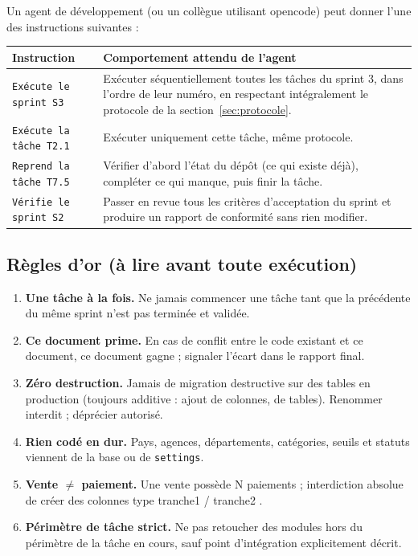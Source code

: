 \documentclass[11pt,a4paper]{article}
\begin{document}
Un agent de développement (ou un collègue utilisant opencode) peut donner l'une des instructions suivantes :

\begin{center}
\begin{tabularx}{\textwidth}{|l|Y|}
\hline
{}\textbf{Instruction} & \textbf{Comportement attendu de l'agent} \\ \hline
\verb|Exécute le sprint S3| & Exécuter séquentiellement toutes les tâches du sprint 3, dans l'ordre de leur numéro, en respectant intégralement le protocole de la section~\ref{sec:protocole}. \\ \hline
\verb|Exécute la tâche T2.1| & Exécuter uniquement cette tâche, même protocole. \\ \hline
\verb|Reprend la tâche T7.5| & Vérifier d'abord l'état du dépôt (ce qui existe déjà), compléter ce qui manque, puis finir la tâche. \\ \hline
\verb|Vérifie le sprint S2| & Passer en revue tous les critères d'acceptation du sprint et produire un rapport de conformité sans rien modifier. \\ \hline
\end{tabularx}
\end{center}

\subsection{Règles d'or (à lire avant toute exécution)}

\begin{enumerate}[nosep]
  \item \textbf{Une tâche à la fois.} Ne jamais commencer une tâche tant que la précédente du même sprint n'est pas terminée et validée.
  \item \textbf{Ce document prime.} En cas de conflit entre le code existant et ce document, ce document gagne ; signaler l'écart dans le rapport final.
  \item \textbf{Zéro destruction.} Jamais de migration destructive sur des tables en production (toujours additive : ajout de colonnes, de tables). Renommer interdit ; déprécier autorisé.
  \item \textbf{Rien codé en dur.} Pays, agences, départements, catégories, seuils et statuts viennent de la base ou de \texttt{settings}.
  \item \textbf{Vente $\neq$ paiement.} Une vente possède N paiements ; interdiction absolue de créer des colonnes type \og tranche1 / tranche2 \fg{}.
  \item \textbf{Périmètre de tâche strict.} Ne pas retoucher des modules hors du périmètre de la tâche en cours, sauf point d'intégration explicitement décrit.
\end{enumerate}
\end{document}

